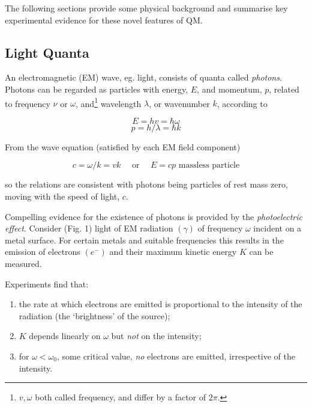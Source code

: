 \documentclass[a4paper]{article}
\begin{document}
The following sections provide some physical background and summarise key experimental evidence for these novel features of QM.
 
\subsection{Light Quanta}

An electromagnetic (EM) wave, eg. light, consists of quanta called \emph{photons}. Photons can be regarded as particles with energy, $ E $, and momentum, $ p $, related to frequency $ \nu $ or $ \omega $, and\footnote{$ v,\omega $  both called frequency, and differ by a factor of $ 2 \pi $.} wavelength $ \lambda $, or wavenumber $ k $, according to

\[ E = h v = \hbar \omega \]
\[ p = h / \lambda = \hbar k \]

  


From the wave equation (satisfied by each EM field component) 

\[ c = \omega / k  = v k \quad \text{ or } \quad E = cp \text{ massless particle}\]

so the relations are consistent with photons being particles of rest mass zero, moving with the speed of light, $ c $.

Compelling evidence for the existence of photons is provided by the \emph{photoelectric effect}. Consider (Fig. 1) light of EM radiation $ (\gamma) $ of frequency $ \omega $ incident on a metal surface. For certain metals and suitable frequencies this results in the emission of electrons $ (e^{-}) $ and their maximum kinetic energy $ K $ can be measured. 


\begin{center}
\end{center}


Experiments find that:

 \begin{enumerate}
 	\item the rate at which electrons are emitted is proportional to the intensity of the radiation (the `brightness' of the source); 
 	\item $ K $ depends linearly on $ \omega $ but \emph{not} on the intensity; 
 	\item for $ \omega < \omega_{0} $, some critical value, \emph{no} electrons are emitted, irrespective of the intensity. 
 	
 \end{enumerate}
\end{document}
